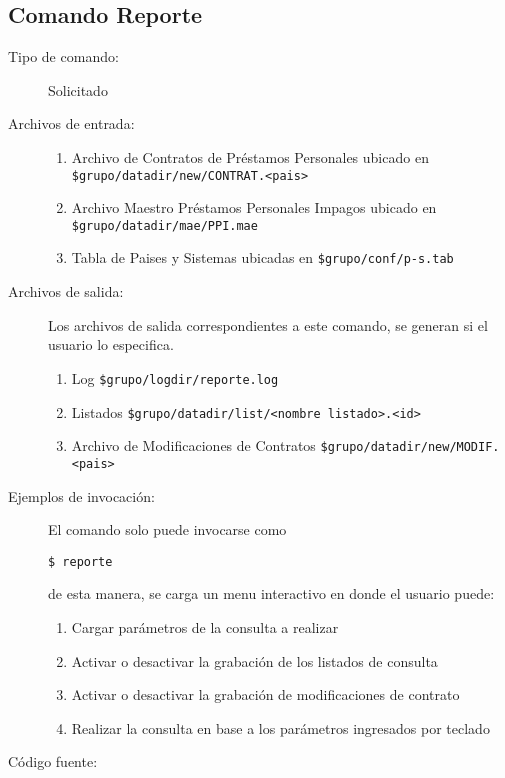 \documentclass[12pt]{article}
\begin{document}
\subsection{Comando Reporte}
\begin{description}
	\item [Tipo de comando:] Solicitado
	
	\item [Archivos de entrada:]
		\begin{enumerate}
		\item Archivo de Contratos de Préstamos Personales ubicado en \verb|$grupo/datadir/new/CONTRAT.<pais>|
		\item Archivo Maestro Préstamos Personales Impagos ubicado en \verb|$grupo/datadir/mae/PPI.mae|
		\item Tabla de Paises y Sistemas ubicadas en \verb|$grupo/conf/p-s.tab|
		\end{enumerate}

	\item [Archivos de salida:] Los archivos de salida correspondientes a este comando, se generan si el usuario lo especifica. 
		\begin{enumerate}
		\item Log  \verb|$grupo/logdir/reporte.log|
		\item Listados \verb|$grupo/datadir/list/<nombre listado>.<id>|
		\item Archivo de Modificaciones de Contratos \verb|$grupo/datadir/new/MODIF.<pais>|
		\end{enumerate}

	\item [Ejemplos de invocación:]	El comando solo puede invocarse como
	\begin{verbatim}$ reporte\end{verbatim}
	de esta manera, se carga un menu interactivo en donde el usuario puede:
		\begin{enumerate}
		\item Cargar parámetros de la consulta a realizar
		\item Activar o desactivar la grabación de los listados de consulta
		\item Activar o desactivar la grabación de modificaciones de contrato
		\item Realizar la consulta en base a los parámetros ingresados por teclado
		\end{enumerate}

	\item [Código fuente:]
\end{description}
{\footnotesize

}
\end{document}
